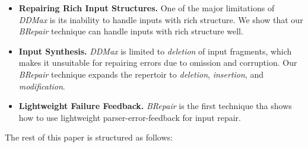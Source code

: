 \documentclass[sigconf,review,anonymous]{acmart}
\newcounter{todocounter}
\newcommand{\todo}[1]{\marginpar{$|$}\textcolor{red}{\stepcounter{todocounter}\footnote[\thetodocounter]{\textcolor{red}{\textbf{TODO }}\textit{#1}}}}
\renewcommand{\todo}[1]{}
\newcommand{\ddmax}{\textit{DDMax}\xspace}
\newcommand{\brepair}{\textit{BRepair}\xspace}
\begin{document}
\begin{itemize}
\item \textbf{Repairing Rich Input Structures.} One of the major limitations of
\ddmax is its inability to handle inputs with rich structure. We show that our
\brepair technique can handle inputs with rich structure well.
\item \textbf{Input Synthesis.} \ddmax is limited to \emph{deletion} of input
fragments, which makes it unsuitable for repairing errors due to omission and
corruption. Our \brepair technique expands the repertoir to \emph{deletion},
\emph{insertion}, and \emph{modification}.
\item \textbf{Lightweight Failure Feedback.} \brepair is the first technique
tha shows how to use lightweight parser-error-feedback for input repair.
\end{itemize}

The rest of this paper is structured as follows: \todo{describe sections/order}
\end{document}
